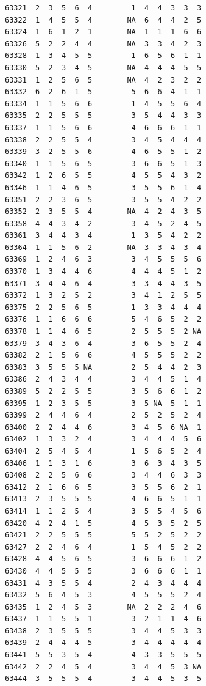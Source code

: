 \documentclass[
  letterpaper,
  DIV=11,
  numbers=noendperiod]{scrreprt}
\begin{document}
\begin{verbatim}
63321  2  3  5  6  4         1  4  4  3  3  3
63322  1  4  5  5  4        NA  6  4  4  2  5
63324  1  6  1  2  1        NA  1  1  1  6  6
63326  5  2  2  4  4        NA  3  3  4  2  3
63328  1  3  4  5  5         1  6  5  6  1  1
63330  5  2  3  4  5        NA  4  4  4  5  5
63331  1  2  5  6  5        NA  4  2  3  2  2
63332  6  2  6  1  5         5  6  6  4  1  1
63334  1  1  5  6  6         1  4  5  5  6  4
63335  2  2  5  5  5         3  5  4  4  3  3
63337  1  1  5  6  6         4  6  6  6  1  1
63338  2  2  5  5  4         3  4  5  4  4  4
63339  3  2  5  5  6         4  6  5  5  1  2
63340  1  1  5  6  5         3  6  6  5  1  3
63342  1  2  6  5  5         4  5  5  4  3  2
63346  1  1  4  6  5         3  5  5  6  1  4
63351  2  2  3  6  5         3  5  5  4  2  2
63352  2  3  5  5  4        NA  4  2  4  3  5
63358  4  4  3  4  2         3  4  5  2  4  5
63361  3  4  4  3  4         1  3  5  4  2  2
63364  1  1  5  6  2        NA  3  3  4  3  4
63369  1  2  4  6  3         3  4  5  5  5  6
63370  1  3  4  4  6         4  4  4  5  1  2
63371  3  4  4  6  4         3  3  4  4  3  5
63372  1  3  2  5  2         3  4  1  2  5  5
63375  2  2  5  6  5         1  3  3  4  4  4
63376  1  1  6  6  6         5  4  6  5  2  2
63378  1  1  4  6  5         2  5  5  5  2 NA
63379  3  4  3  6  4         3  6  5  5  2  4
63382  2  1  5  6  6         4  5  5  5  2  2
63383  3  5  5  5 NA         2  5  4  4  2  3
63386  2  4  3  4  4         3  4  4  5  1  4
63389  5  2  2  5  5         3  5  6  6  1  2
63395  1  2  3  5  5         3  5 NA  5  1  1
63399  2  4  4  6  4         2  5  2  5  2  4
63400  2  2  4  4  6         3  4  5  6 NA  1
63402  1  3  3  2  4         3  4  4  4  5  6
63404  2  5  4  5  4         1  5  6  5  2  4
63406  1  1  3  1  6         3  6  3  4  3  5
63408  2  2  5  6  6         3  4  4  6  3  3
63412  2  1  6  6  5         3  5  5  6  2  1
63413  2  3  5  5  5         4  6  6  5  1  1
63414  1  1  2  5  4         3  5  5  4  5  6
63420  4  2  4  1  5         4  5  3  5  2  5
63421  2  2  5  5  5         5  5  2  5  2  2
63427  2  2  4  6  4         1  5  4  5  2  2
63428  4  4  5  6  5         3  6  6  6  1  2
63430  4  4  5  5  5         3  6  6  6  1  1
63431  4  3  5  5  4         2  4  3  4  4  4
63432  5  6  4  5  3         4  5  5  5  2  4
63435  1  2  4  5  3        NA  2  2  2  4  6
63437  1  1  5  5  1         3  2  1  1  4  6
63438  2  3  5  5  5         3  4  4  5  3  3
63439  2  4  4  4  5         3  4  4  4  4  4
63441  5  5  3  5  4         4  3  3  5  5  5
63442  2  2  4  5  4         3  4  4  5  3 NA
63444  3  5  5  5  4         3  4  4  5  3  5

\end{verbatim}
\end{document}
